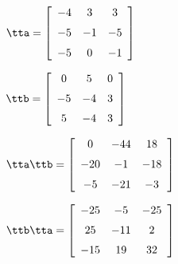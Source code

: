 {$\tta = \left[ \begin {array}{ccc} -4&3&3\\\noalign{\medskip}-5&-1&-5
\\\noalign{\medskip}-5&0&-1\end {array} \right]   $ 

$\ttb =  \left[ \begin {array}{ccc} 0&5&0\\\noalign{\medskip}-5&-4&3
\\\noalign{\medskip}5&-4&3\end {array} \right] $}
{$\tta\ttb = \left[ \begin {array}{ccc} 0&-44&18\\\noalign{\medskip}-20&-1&-18
\\\noalign{\medskip}-5&-21&-3\end {array} \right]$

$\ttb\tta = \left[ \begin {array}{ccc} -25&-5&-25\\\noalign{\medskip}25&-11&2
\\\noalign{\medskip}-15&19&32\end {array} \right]$ }
